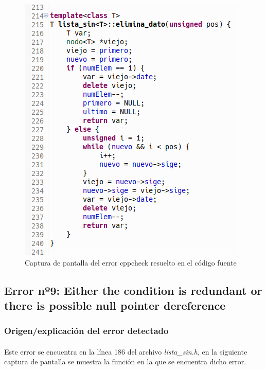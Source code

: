 		\begin{figure}[H]
			\centering
			\includegraphics[scale=0.55]{img/captura87.png}
			\caption{Captura de pantalla del error cppcheck resuelto en el código fuente}
			\label{captura87}
		\end{figure}
	
	\subsection{Error nº9: Either the condition is redundant or there is possible null pointer dereference}
	
		\subsubsection{Origen/explicación del error detectado}
		
			\paragraph{}Este error se encuentra en la línea 186 del archivo \textit{lista\_sin.h}, en la siguiente captura de pantalla se muestra la función en la que se encuentra dicho error.
		
